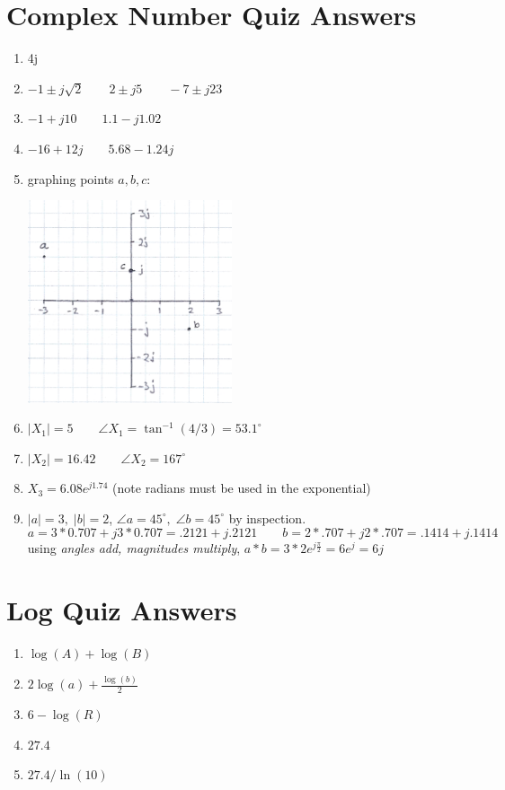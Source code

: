 \clearpage
\newpage
\section{Complex Number Quiz Answers}\label{CN_answers}

\begin{enumerate}
\item 4j

\item $-1\pm j\sqrt{2} \qquad  2\pm j5 \qquad -7\pm j23  $

\item $-1+j10 \qquad 1.1-j1.02$

\item $-16+12j \qquad 5.68-1.24j$

\item graphing points $a,b,c$:

\includegraphics[width=6cm]{figsapdx/00927a.png}

\item $|X_1| = 5 \qquad \angle X_1 = \tan^{-1}(4/3) = 53.1^\circ$

\item $|X_2| = 16.42 \qquad \angle{X_2} = 167^\circ$

\item $X_3 = 6.08e^{j1.74}$ (note radians must be used in the exponential)

\item $|a| = 3, \; |b| = 2$,  $\angle a = 45^\circ,\; \angle b = 45^\circ$  by inspection.
\[
a = 3*0.707 + j3*0.707 = .2121+j.2121 \qquad b = 2*.707 + j2*.707 = .1414+j.1414
\]
using {\it angles add, magnitudes multiply}, $a*b = 3*2e^{j\frac{\pi}{2}} = 6e^j = 6j$

\end{enumerate}



\section{Log Quiz Answers}\label{Log_answers}


\begin{enumerate}

\item $\log(A) + \log(B)$

\item $2\log(a)+\frac{\log(b)}{2}$

\item $6-\log(R)$

\item $27.4$

\item $27.4/\ln(10)$

\end{enumerate}

